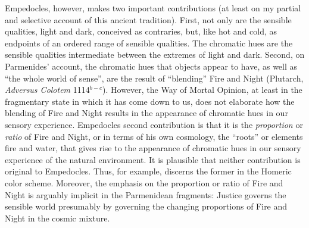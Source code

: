 Empedocles, however, makes two important contributions (at least on my partial and selective account of this ancient tradition). First, not only are the sensible qualities, light and dark, conceived as contraries, but, like hot and cold, as endpoints of an ordered range of sensible qualities. The chromatic hues are the sensible qualities intermediate between the extremes of light and dark. Second, on Parmenides' account, the chromatic hues that objects appear to have, as well as ``the whole world of sense'', are the result of ``blending'' Fire and Night (Plutarch, \emph{Adversus Colotem} 1114\( ^{b-c} \)). However, the Way of Mortal Opinion, at least in the fragmentary state in which it has come down to us, does not elaborate how the blending of Fire and Night results in the appearance of chromatic hues in our sensory experience. Empedocles second contribution is that it is the \emph{proportion} or \emph{ratio} of Fire and Night, or in terms of his own cosmology, the ``roots'' or elements fire and water, that gives rise to the appearance of chromatic hues in our sensory experience of the natural environment. It is plausible that neither contribution is original to Empedocles. Thus, for example, \citet{Gladstone:1858fk} discerns the former in the Homeric color scheme. Moreover, the emphasis on the proportion or ratio of Fire and Night is arguably implicit in the Parmenidean fragments: Justice governs the sensible world presumably by governing the changing proportions of Fire and Night in the cosmic mixture.

